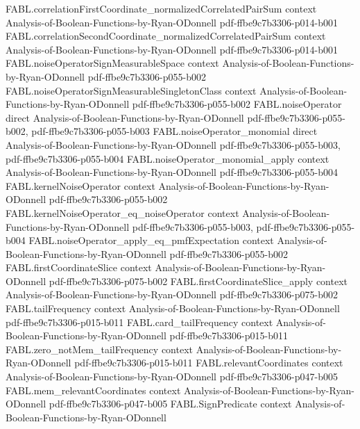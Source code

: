 \begin{theorem}
  {FABL.correlationFirstCoordinate_normalizedCorrelatedPairSum}
  {context}
  {Analysis-of-Boolean-Functions-by-Ryan-ODonnell}
  {pdf-ffbe9c7b3306-p014-b001}
\proofstep
  {FABL.correlationSecondCoordinate_normalizedCorrelatedPairSum}
  {context}
  {Analysis-of-Boolean-Functions-by-Ryan-ODonnell}
  {pdf-ffbe9c7b3306-p014-b001}
\proofstep
  {FABL.noiseOperatorSignMeasurableSpace}
  {context}
  {Analysis-of-Boolean-Functions-by-Ryan-ODonnell}
  {pdf-ffbe9c7b3306-p055-b002}
\proofstep
  {FABL.noiseOperatorSignMeasurableSingletonClass}
  {context}
  {Analysis-of-Boolean-Functions-by-Ryan-ODonnell}
  {pdf-ffbe9c7b3306-p055-b002}
\proofstep
  {FABL.noiseOperator}
  {direct}
  {Analysis-of-Boolean-Functions-by-Ryan-ODonnell}
  {pdf-ffbe9c7b3306-p055-b002,
    pdf-ffbe9c7b3306-p055-b003}
\proofstep
  {FABL.noiseOperator_monomial}
  {direct}
  {Analysis-of-Boolean-Functions-by-Ryan-ODonnell}
  {pdf-ffbe9c7b3306-p055-b003,
    pdf-ffbe9c7b3306-p055-b004}
\proofstep
  {FABL.noiseOperator_monomial_apply}
  {context}
  {Analysis-of-Boolean-Functions-by-Ryan-ODonnell}
  {pdf-ffbe9c7b3306-p055-b004}
\proofstep
  {FABL.kernelNoiseOperator}
  {context}
  {Analysis-of-Boolean-Functions-by-Ryan-ODonnell}
  {pdf-ffbe9c7b3306-p055-b002}
\proofstep
  {FABL.kernelNoiseOperator_eq_noiseOperator}
  {context}
  {Analysis-of-Boolean-Functions-by-Ryan-ODonnell}
  {pdf-ffbe9c7b3306-p055-b003,
    pdf-ffbe9c7b3306-p055-b004}
\proofstep
  {FABL.noiseOperator_apply_eq_pmfExpectation}
  {context}
  {Analysis-of-Boolean-Functions-by-Ryan-ODonnell}
  {pdf-ffbe9c7b3306-p055-b002}
\proofstep
  {FABL.firstCoordinateSlice}
  {context}
  {Analysis-of-Boolean-Functions-by-Ryan-ODonnell}
  {pdf-ffbe9c7b3306-p075-b002}
\proofstep
  {FABL.firstCoordinateSlice_apply}
  {context}
  {Analysis-of-Boolean-Functions-by-Ryan-ODonnell}
  {pdf-ffbe9c7b3306-p075-b002}
\proofstep
  {FABL.tailFrequency}
  {context}
  {Analysis-of-Boolean-Functions-by-Ryan-ODonnell}
  {pdf-ffbe9c7b3306-p015-b011}
\proofstep
  {FABL.card_tailFrequency}
  {context}
  {Analysis-of-Boolean-Functions-by-Ryan-ODonnell}
  {pdf-ffbe9c7b3306-p015-b011}
\proofstep
  {FABL.zero_notMem_tailFrequency}
  {context}
  {Analysis-of-Boolean-Functions-by-Ryan-ODonnell}
  {pdf-ffbe9c7b3306-p015-b011}
\proofstep
  {FABL.relevantCoordinates}
  {context}
  {Analysis-of-Boolean-Functions-by-Ryan-ODonnell}
  {pdf-ffbe9c7b3306-p047-b005}
\proofstep
  {FABL.mem_relevantCoordinates}
  {context}
  {Analysis-of-Boolean-Functions-by-Ryan-ODonnell}
  {pdf-ffbe9c7b3306-p047-b005}
\proofstep
  {FABL.SignPredicate}
  {context}
  {Analysis-of-Boolean-Functions-by-Ryan-ODonnell}

\end{theorem}
